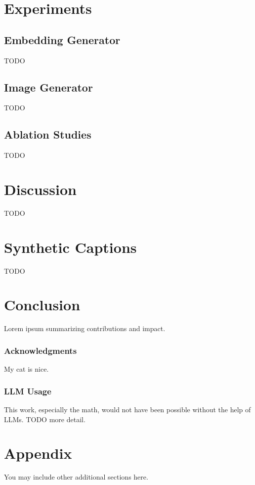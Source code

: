\documentclass{article} %
\begin{document}
\section{Experiments}

\subsection{Embedding Generator}
TODO

\subsection{Image Generator}
TODO

\subsection{Ablation Studies}
TODO

\section{Discussion}

TODO

\section{Synthetic Captions}
\label{sec:syntheticcaptions}

TODO

\section{Conclusion}

Lorem ipsum summarizing contributions and impact.

\subsubsection*{Acknowledgments}
My cat is nice.

\subsubsection*{LLM Usage}
This work, especially the math, would not have been possible without the help of LLMs. TODO more
detail.




\appendix
\section{Appendix}
You may include other additional sections here.
\end{document}
